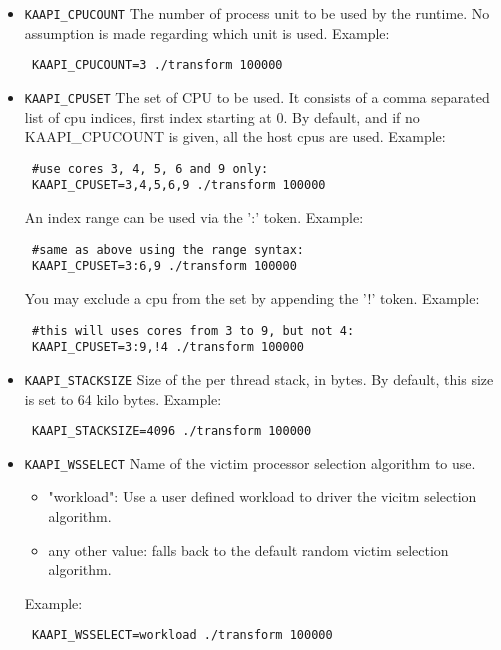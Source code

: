 \documentclass{article}
\begin{document}
\begin{itemize} %

\item \verb+KAAPI_CPUCOUNT+\newline
The number of process unit to be used by the runtime.
No assumption is made regarding which unit is used.
Example:
\begin{verbatim}
 KAAPI_CPUCOUNT=3 ./transform 100000
\end{verbatim}

\item \verb+KAAPI_CPUSET+\newline
The set of CPU to be used. It consists of a comma
separated list of cpu indices, first index starting
at 0. By default, and if no KAAPI\_CPUCOUNT is given,
all the host cpus are used.
Example:
\begin{verbatim}
 #use cores 3, 4, 5, 6 and 9 only:
 KAAPI_CPUSET=3,4,5,6,9 ./transform 100000
\end{verbatim}

An index range can be used via the ':' token.
Example:
\begin{verbatim}
 #same as above using the range syntax:
 KAAPI_CPUSET=3:6,9 ./transform 100000
\end{verbatim}

You may exclude a cpu from the set by appending the '!' token.
Example:
\begin{verbatim}
 #this will uses cores from 3 to 9, but not 4:
 KAAPI_CPUSET=3:9,!4 ./transform 100000
\end{verbatim}

\item \verb+KAAPI_STACKSIZE+\newline
Size of the per thread stack, in bytes. By default, this size
is set to 64 kilo bytes.
Example:
\begin{verbatim}
 KAAPI_STACKSIZE=4096 ./transform 100000
\end{verbatim}

\item \verb+KAAPI_WSSELECT+\newline
Name of the victim processor selection algorithm to use.
\begin{itemize}
\item "workload":
Use a user defined workload to driver the vicitm selection algorithm.
\item any other value: falls back to the default random victim selection
algorithm.
\end{itemize}
Example:
\begin{verbatim}
 KAAPI_WSSELECT=workload ./transform 100000
\end{verbatim}
\end{itemize} %
\end{document}
